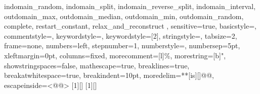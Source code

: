 {{  indomain_random, indomain_split, indomain_reverse_split,
  indomain_interval, outdomain_max, outdomain_median, outdomain_min,
  outdomain_random, complete, restart_constant, relax_and_reconstruct
  },
  sensitive=true,
  basicstyle=\mznfont,
  commentstyle=\color[rgb]{0.9,0.1,0.1},
  keywordstyle=\color[rgb]{0,0.5,0},
  keywordstyle=[2]\color{blue},
  stringstyle=\color{orange},
  tabsize=2,
  frame=none,
  numbers=left,
  stepnumber=1,
  numberstyle=\tiny,
  numbersep=5pt,
  xleftmargin=0pt, %
  columns=fixed, %
  morecomment=[l]{\%},
  morestring=[b]",
  showstringspaces=false,
  mathescape=true,
  breaklines=true,
  breakatwhitespace=true,
  breakindent=10pt, %
  moredelim=**[is][\color{Melon}]{@}{@},
  escapeinside={{<@}{@>}}
}
[1][]{\lstset{language=Mzn,#1}}{}
[1][]{\lstset{language=Mzn,numbers=none,xleftmargin=0pt,#1}}{}
\newcommand{\mzninline}[1]{\lstinline[{language=Mzn}]|#1|}
\newcommand{\mzninlinebar}[1]{\lstinline[{language=Mzn}]!#1!}
